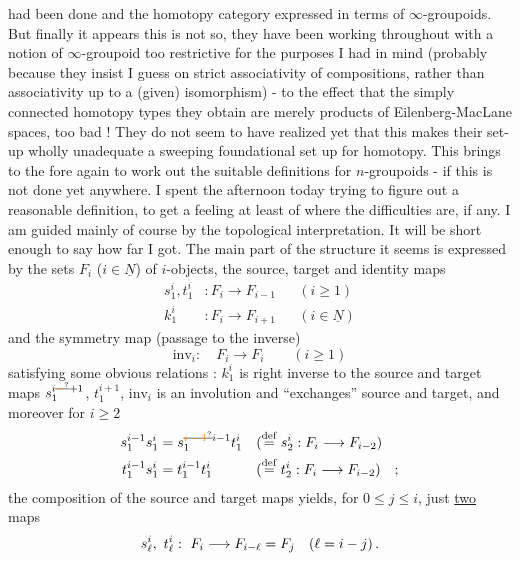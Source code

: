 had been done and the homotopy category expressed in terms of $\infty$-groupoids. But finally it appears this is not so, they have been working throughout with a notion of $\infty$-groupoid too restrictive for the purposes I had in mind (probably because they insist I guess on strict associativity of compositions, rather than associativity up to a (given) isomorphism) - to the effect that the simply connected homotopy types they obtain are merely products of Eilenberg-MacLane spaces, too bad ! They do not seem to have realized yet that this makes their set-up wholly unadequate  a sweeping foundational set up for homotopy. This brings to the fore again to work out the suitable definitions for $n$-groupoids - if this is not done yet anywhere. I spent the afternoon today trying to figure out a reasonable definition, to get a feeling at least of where the difficulties are, if any. I am guided mainly of course by the topological interpretation. It will be short enough to say how far I got. The main part of the structure it seems is expressed by the sets $F_i$ ($i\in\underline{N}$) of $i$-objects, the source, target and identity maps
\[
\begin{aligned}
s^i_1,t^i_1 &: F_i\longrightarrow F_{i-1} &&(i\geq 1)\\
k^i_1 &: F_i\longrightarrow F_{i+1} &&(i\in\underline{N})
\end{aligned}
\]
and the symmetry map (passage to the inverse)
\[
\mathrm{inv}_i:\quad F_i\longrightarrow F_i\qquad(i\geq 1)
\]
satisfying some obvious relations : $k^i_1$ is right inverse to the  source and target maps $s_1^{i\deleted{\unsure{-}}+1}$, $t_1^{i+1}$, $\mathrm{inv}_i$ is an involution and ``exchanges'' source and target, and moreover for $i\geq 2$
\[
\begin{aligned}
s^{i-1}_1s^i_1&=s^{\deleted{\unsure{i-1}}i-1}_1t^i_1 &&(\mathrel{\overset{\mathrm{def}}{=}}s^i_2:F_i\longrightarrow F_{i-2})\\
t^{i-1}_1s^i_1&=t^{i-1}_1t^i_1 &&(\mathrel{\overset{\mathrm{def}}{=}}t^i_2:F_i\longrightarrow F_{i-2})\quad;
\end{aligned}
\]
 the composition of the source and target maps yields, for $0\leq j\leq i$, just \uline{two} maps
\[
s^i_\ell,\ t^i_\ell:\ F_i\longrightarrow F_{i-\ell}\handwritten{=F_j}\quad(\ell=i-j)\,.
\]
